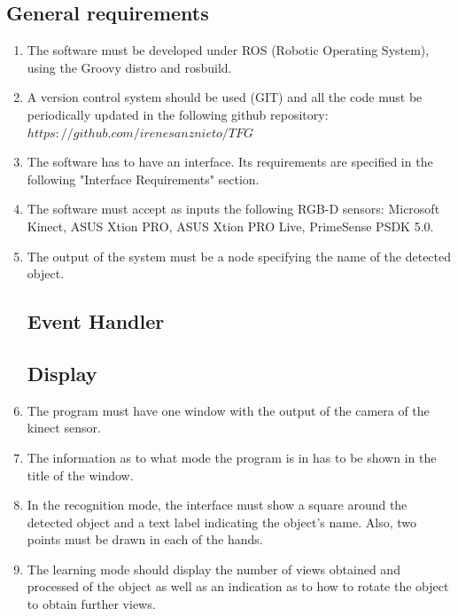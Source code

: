 \documentclass{article}
\makeatletter
\def\threedigits#1{\expandafter\@threedigits\csname c@#1\endcsname}
\def\@threedigits#1{%
  \ifnum#1<100 0\fi
  \ifnum#1<10 0\fi
  \number#1}
\makeatother
\begin{document}
\subsection{General requirements}
\begin{enumerate}[label=\textbf{FR\threedigits*}, leftmargin=2cm]

	\item The software must be developed under ROS (Robotic Operating System), using the Groovy distro and rosbuild.
	\item A version control system should be used (GIT) and all the code must be periodically updated in the following github repository:  $https://github.com/irenesanznieto/TFG$
	\item The software has to have an interface. Its requirements are specified in the following "Interface Requirements" section. 
	\item The software must accept as inputs the following RGB-D sensors: Microsoft Kinect, ASUS Xtion PRO, ASUS Xtion PRO Live, PrimeSense PSDK 5.0.
	\item The output of the system must be a node specifying the name of the detected object. 
 
\subsection{Event Handler}
 
\subsection{Display}

\item The program must have one window with the output of the camera of the kinect sensor. 
\item The information as to what mode the program is in has to be shown in the title of the window.
\item In the recognition mode, the interface must show a square around the detected object and a text label indicating the object's name. Also, two points must be drawn in each of the hands. 
\item The learning mode should display the number of views obtained and processed of the object as well as an indication as to how to rotate the object to obtain further views. 



\end{enumerate}
\end{document}
